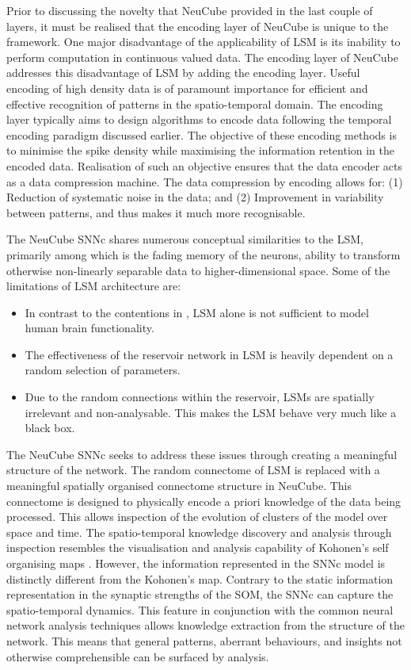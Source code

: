 Prior to discussing the novelty that NeuCube provided in the last couple of layers, it must be realised that the encoding layer of NeuCube is unique to the framework. One major disadvantage of the applicability of LSM is its inability to perform computation in continuous valued data. The encoding layer of NeuCube addresses this disadvantage of LSM by adding the encoding layer. Useful encoding of high density data is of paramount importance for efficient and effective recognition of patterns in the spatio-temporal domain. The encoding layer typically aims to design algorithms to encode data following the temporal encoding paradigm discussed earlier. The objective of these encoding methods is to minimise the spike density while maximising the information retention in the encoded data. Realisation of such an objective ensures that the data encoder acts as a data compression machine. The data compression by encoding allows for: (1) Reduction of systematic noise in the data; and (2) Improvement in variability between patterns, and thus makes it much more recognisable.

The NeuCube SNNc shares numerous conceptual similarities to the LSM, primarily among which is the fading memory of the neurons, ability to transform otherwise non-linearly separable data to higher-dimensional space. Some of the limitations of LSM architecture are:

\begin{itemize}
	\item In contrast to the contentions in \citep{natschlager2002liquid}, LSM alone is not sufficient to model human brain functionality.
	\item The effectiveness of the reservoir network in LSM is heavily dependent on a random selection of parameters.
	\item Due to the random connections within the reservoir, LSMs are spatially irrelevant and non-analysable. This makes the LSM behave very much like a black box.
\end{itemize}

The NeuCube SNNc seeks to address these issues through creating a meaningful structure of the network. The random connectome of LSM is replaced with a meaningful spatially organised connectome structure in NeuCube. This connectome is designed to physically encode a priori knowledge of the data being processed. This allows inspection of the evolution of clusters of the model over space and time. The spatio-temporal knowledge discovery and analysis through inspection resembles the visualisation and analysis capability of Kohonen's self organising maps \citep{kohonen1990self}. However, the information represented in the SNNc model is distinctly different from the Kohonen's map. Contrary to the static information representation in the synaptic strengths of the SOM, the SNNc can capture the spatio-temporal dynamics. This feature in conjunction with the common neural network analysis techniques allows knowledge extraction from the structure of the network. This means that general patterns, aberrant behaviours, and insights not otherwise comprehensible can be surfaced by analysis. 

